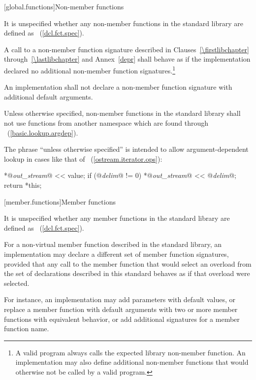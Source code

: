 [global.functions]{Non-member functions}

\pnum
It is unspecified whether any
non-member
functions in the \Cpp standard library are defined as
~(\ref{dcl.fct.spec}).

\pnum
A call to a non-member function signature
described in Clauses~\ref{\firstlibchapter} through~\ref{\lastlibchapter} and
Annex~\ref{depr} shall behave as if the implementation declared no additional
non-member function signatures.\footnote{A valid \Cpp program always
calls the expected library non-member function. An implementation may
also define additional non-member functions that would otherwise not
be called by a valid \Cpp program.}

\pnum
An implementation shall not declare a non-member function signature
with additional default arguments.

\pnum
Unless otherwise specified, non-member functions in the standard
library shall not use functions from another namespace which are found through
~(\ref{basic.lookup.argdep}).
\begin{note}
The phrase ``unless otherwise specified'' is intended to allow
argument-dependent lookup
in cases like that of
~(\ref{ostream.iterator.ops}):

\effects
\begin{codeblock}
*@\textit{out_stream}@ << value;
if (@\textit{delim}@ != 0)
  *@\textit{out_stream}@ << @\textit{delim}@;
return *this;
\end{codeblock}
\end{note}

[member.functions]{Member functions}

\pnum
It is unspecified whether any member functions in the \Cpp standard library are defined as
~(\ref{dcl.fct.spec}).

\pnum
For a non-virtual member function described in the \Cpp standard library,
an implementation may declare a different set of member function signatures,
provided that any call to the member function that would select
an overload from the set of declarations described in this standard
behaves as if that overload were selected.
\begin{note}
For instance, an implementation may add parameters with default values,
or replace a member function with default arguments
with two or more member functions with equivalent behavior,
or add additional signatures for a member function name.
\end{note}

